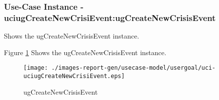 
	\subsubsection{Use-Case Instance - uciugCreateNewCrisiEvent:ugCreateNewCrisisEvent}
	
	Shows the ugCreateNewCrisisEvent instance.		  
	\begin{operationmodel}
	
	\end{operationmodel} 

	
	Figure \ref{fig:lu.uni.lassy.excalibur.group09.spec-RE-UC-uci-uciugCreateNewCrisiEvent}
	Shows the ugCreateNewCrisisEvent instance.
	
	\begin{figure}[htbp]
	\begin{center}
	
	\texttt{[image: ./images-report-gen/usecase-model/usergoal/uci-uciugCreateNewCrisiEvent.eps]}
	\end{center}
	\caption[lu.uni.lassy.excalibur.group09.spec Sequence Diagram: uci-uciugCreateNewCrisiEvent]{ugCreateNewCrisisEvent}
	\label{fig:lu.uni.lassy.excalibur.group09.spec-RE-UC-uci-uciugCreateNewCrisiEvent}
	\end{figure}
	\vspace{0.5cm}
